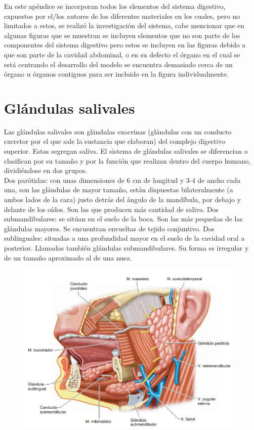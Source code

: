 \appendix  \label{app}
\addappheadtotoc 
\appendixpage

En este ap\'endice se incorporan todos los elementos del sistema digestivo, expuestos por el/los autores de los diferentes materiales en los cuales, 
pero no limitados a estos, se realizó la investigación del sistema, cabe mencionar que en algunas figuras que se muestran se incluyen elementos 
que no son parte de los componentes del sistema digestivo pero estos se incluyen en las figuras debido a que son parte de la cavidad abdominal, 
o en su defecto el órgano en el cual se está centrando el desarrollo del modelo se encuentra demasiado cerca de un órgano u órganos contiguos 
para ser incluido en la figura individualmente.\\

\section{Glándulas salivales}
Las glándulas salivales son glándulas exocrinas (glándulas con un conducto excretor por el que sale la sustancia que elaboran) del complejo digestivo 
superior. Estas segregan saliva. El sistema de  glándulas salivales se diferencian o clasifican por  su tamaño y por la función que realizan dentro 
del cuerpo humano, dividiéndose en dos grupos.\\ 
Dos parótidas: con unas dimensiones de 6 cm de longitud y 3-4 de ancho cada una, son las glándulas de mayor tamaño, están dispuestas bilateralmente 
(a ambos lados de la cara) justo detrás del ángulo de la mandíbula, por debajo y delante de los oídos. Son las que producen más cantidad de saliva.
Dos submandibulares: se sitúan en el suelo de la boca. Son las más pequeñas de las glándulas mayores. Se encuentran envueltas de tejido conjuntivo.
Dos sublinguales: situadas a una profundidad mayor en el suelo de la cavidad oral a posterior. Llamadas también glándulas submandibulares. Su forma 
es irregular y de un tamaño aproximado al de una nuez.\\
\begin{figure}[H]
	\begin{center}
 		\includegraphics[width = .7\textwidth]{v2/images/image34.png}
	\end{center} 
\end{figure}

